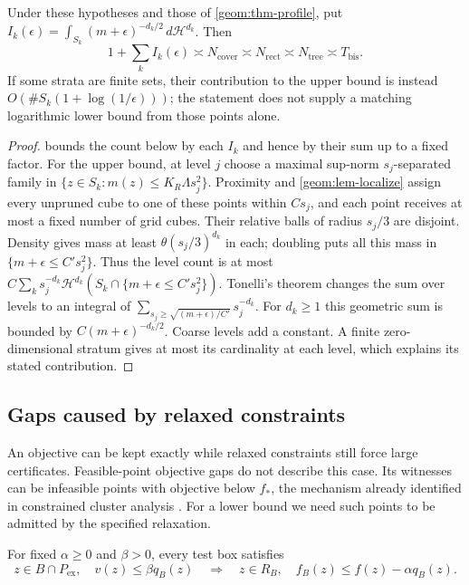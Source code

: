 \begin{theorem}
\label{geom:thm-integral}
Under these hypotheses and those of \cref{geom:thm-profile}, put
$I_k(\epsilon)=\int_{S_k}(m+\epsilon)^{-d_k/2}\,d\mathcal H^{d_k}$.
Then
\[
 1+\sum_k I_k(\epsilon)\asymp N_{\mathrm{cover}}
 \asymp N_{\mathrm{rect}}\asymp N_{\mathrm{tree}}
 \asymp T_{\mathrm{bis}}.
\]
If some strata are finite sets, their contribution to the upper bound
is instead $O(\#S_k(1+\log(1/\epsilon)))$; the statement does not supply
a matching logarithmic lower bound from those points alone.
\end{theorem}
\begin{proof}
 bounds the count below by each $I_k$ and hence
by their sum up to a fixed factor. For the upper bound, at level $j$
choose a maximal sup-norm $s_j$-separated family in
$\{z\in S_k:m(z)\leq K_R\Lambda s_j^2\}$. Proximity and
\cref{geom:lem-localize} assign every unpruned cube to one of these
points within $Cs_j$, and each point receives at most a fixed number
of grid cubes. Their relative balls of radius $s_j/3$ are disjoint.
Density gives mass at least $\theta(s_j/3)^{d_k}$ in each; doubling puts
all this mass in $\{m+\epsilon\leq C's_j^2\}$. Thus the level count
is at most
$C\sum_k s_j^{-d_k}\mathcal H^{d_k}
(S_k\cap\{m+\epsilon\leq C's_j^2\})$.
Tonelli's theorem changes the sum over levels to an integral of
$\sum_{s_j\geq\sqrt{(m+\epsilon)/C'}}s_j^{-d_k}$.
For $d_k\geq1$ this geometric sum is bounded by
$C(m+\epsilon)^{-d_k/2}$. Coarse levels add a constant. A finite
zero-dimensional stratum gives at most its cardinality at each level,
which explains its stated contribution.
\end{proof}

\subsection{Gaps caused by relaxed constraints}

An objective can be kept exactly while relaxed constraints still force
large certificates. Feasible-point objective gaps do not describe this
case. Its witnesses can be infeasible points with objective below $f_*$,
the mechanism already identified in constrained cluster analysis
\citep{kannanBarton2017ConstrainedCluster}. For a lower bound we need
such points to be admitted by the specified relaxation.

\begin{assumption}\label{geom:ass-tube}
For fixed $\alpha\geq0$ and $\beta>0$, every test box satisfies
\begin{equation}\label{geom:eq-tube}
 z\in B\cap P_{\mathrm{ex}},\quad v(z)\leq\beta q_B(z)
 \quad\Longrightarrow\quad
 z\in R_B,\quad f_B(z)\leq f(z)-\alpha q_B(z).
\end{equation}
\end{assumption}

